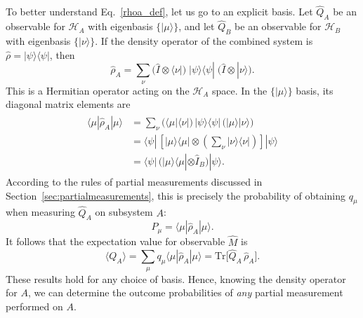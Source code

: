 \documentclass[pra,12pt]{revtex4}
\begin{document}
To better understand Eq.~\eqref{rhoa_def}, let us go to an explicit
basis.  Let $\hat{Q}_A$ be an observable for $\mathscr{H}_A$ with
eigenbasis $\{|\mu\rangle\}$, and let $\hat{Q}_B$ be an observable for
$\mathscr{H}_B$ with eigenbasis $\{|\nu\rangle\}$.  If the density
operator of the combined system is $\hat{\rho} = |\psi\rangle\langle
\psi|$, then
\begin{equation}
  \hat{\rho}_A =
    \sum_\nu
    \Big( \hat{I}\otimes \langle \nu| \Big)
    \; |\psi\rangle \langle \psi | \;
    \Big( \hat{I}\otimes | \nu\rangle \Big).
    \label{rhoa_explicit}
\end{equation}
This is a Hermitian operator acting on the $\mathscr{H}_A$ space.  In
the $\{|\mu\rangle\}$ basis, its diagonal matrix elements are
\begin{align}
  \begin{aligned}
    \langle \mu | \hat{\rho}_A | \mu \rangle
    &=
    \sum_\nu
    \Big( \langle \mu| \langle \nu| \Big)
    \, |\psi\rangle \langle \psi | \,
    \Big( |\mu\rangle | \nu\rangle \Big) \\
    &=
    \langle \psi | \,
    \left[ |\mu\rangle \langle \mu| \otimes
      \left(\sum_\nu | \nu\rangle \langle \nu|\right) \right]
    |\psi\rangle \\
    &=
    \langle \psi | \,
    \Big( |\mu\rangle \langle \mu| \otimes \hat{I}_B\Big) |\psi\rangle.
  \end{aligned}
\end{align}
According to the rules of partial measurements discussed in
Section~\ref{sec:partialmeasurements}, this is precisely the
probability of obtaining $q_\mu$ when measuring $\hat{Q}_A$ on subsystem
$A$:
\begin{equation}
  P_\mu = \langle \mu | \hat{\rho}_A | \mu \rangle.
  \label{rho_prob}
\end{equation}
It follows that the expectation value for observable $\hat{M}$ is
\begin{equation}
  \langle Q_A \rangle = \sum_\mu q_\mu
  \langle \mu | \hat{\rho}_A | \mu \rangle
  = \mathrm{Tr}\Big[\hat{Q}_A \, \hat{\rho}_A \Big].
  \label{rho_expect}
\end{equation}
These results hold for any choice of basis.  Hence, knowing the
density operator for $A$, we can determine the outcome probabilities
of \textit{any} partial measurement performed on $A$.
\end{document}
